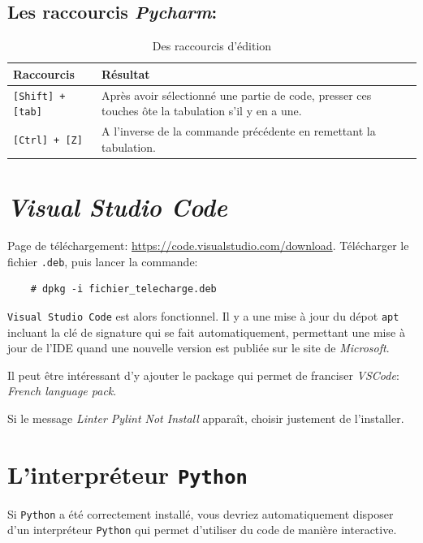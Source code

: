 \subsection*{Les raccourcis \textit{Pycharm}:}
\begin{table}[h]
\begin{center}
\begin{tabular}{|p{4cm}|p{10cm}|}
\hline
\textbf{Raccourcis} & \textbf{Résultat} \\
\hline
\texttt{[Shift] + [tab]} & Après avoir sélectionné une partie de code, presser ces touches ôte la tabulation s'il y en a une. \\
\hline
\texttt{[Ctrl] + [Z]} & A l'inverse de la commande précédente en remettant la tabulation. \\
\hline
\end{tabular}
\caption{Des raccourcis d'édition}
\end{center}

\end{table}
\section{\textit{Visual Studio Code}}
Page de téléchargement: \url{https://code.visualstudio.com/download}. Télécharger le fichier \texttt{.deb}, puis lancer la commande:
\begin{verbatim}
    # dpkg -i fichier_telecharge.deb
\end{verbatim}
\medskip

\texttt{Visual Studio Code} est alors fonctionnel. Il y a une mise à jour du dépot \texttt{apt} incluant la clé de signature qui se fait automatiquement, permettant une mise à jour de l'IDE  quand une nouvelle version est publiée sur le site de \textit{Microsoft}.
\medskip

Il peut être intéressant d'y ajouter le package qui permet de franciser \textit{VSCode}: \textit{French language pack}.
\medskip

Si le message \textit{Linter Pylint Not Install} apparaît, choisir justement de l'installer.
\medskip

\section{L'interpréteur \texttt{Python}}
Si \texttt{Python} a été correctement installé, vous devriez automatiquement disposer d'un interpréteur \texttt{Python} qui permet d'utiliser du code de manière interactive.
\medskip

